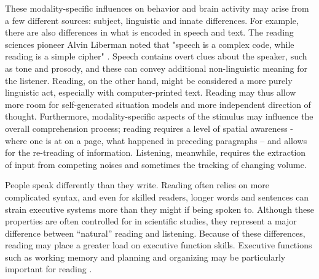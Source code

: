 These modality-specific influences on behavior and brain activity may arise from a few different sources: subject, linguistic and innate differences. For example, there are also differences in what is encoded in speech and text. The reading sciences pioneer Alvin Liberman noted that "speech is a complex code, while reading is a simple cipher" \cite{Mattingly1972}. Speech contains overt clues about the speaker, such as tone and prosody, and these can convey additional non-linguistic meaning for the listener. Reading, on the other hand, might be considered a more purely linguistic act, especially with computer-printed text. Reading may thus allow more room for self-generated situation models and more independent direction of thought. Furthermore, modality-specific aspects of the stimulus may influence the overall comprehension process; reading requires a level of spatial awareness -where one is at on a page, what happened in preceding paragraphs – and allows for the re-treading of information. Listening, meanwhile, requires the extraction of input from competing noises and sometimes the tracking of changing volume. 

People speak differently than they write. Reading often relies on more complicated syntax, and even for skilled readers, longer words and sentences can strain executive systems more than they might if being spoken to. Although these properties are often controlled for in scientific studies, they represent a major difference between “natural” reading and listening. Because of these differences, reading may place a greater load on executive function skills. Executive functions such as working memory and planning and organizing may be particularly important for reading \citep{Cain}.  

\begin{table}
	\renewcommand{\tabcolsep}{0.09cm}
	\centering
	
	\caption[Summary of findings for Study 1.]
	\label{table:ch2-results}
\end{table}

